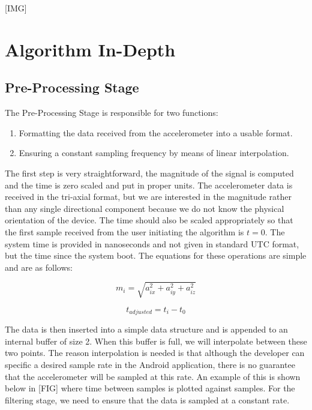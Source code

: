         [IMG]

    \chapter{Algorithm In-Depth}

        \section{Pre-Processing Stage}

            The Pre-Processing Stage is responsible for two functions:

            \begin{enumerate}
                \item Formatting the data received from the accelerometer into a usable format.
                \item Ensuring a constant sampling frequency by means of linear interpolation.
            \end{enumerate}

            The first step is very straightforward, the magnitude of the signal is computed and the time is zero scaled and put in proper units. The accelerometer data is received in the tri-axial format, but we are interested in the magnitude rather than any single directional component because we do not know the physical orientation of the device. The time should also be scaled appropriately so that the first sample received from the user initiating the algorithm is $t = 0$. The system time is provided in nanoseconds and not given in standard UTC format, but the time since the system boot. The equations for these operations are simple and are as follows:

            \begin{equation}
                m_i = \sqrt{a_{ix}^2 + a_{iy}^2 + a_{iz}^2}
            \end{equation}

            \begin{equation}
                t_{adjusted} = t_i - t_0
            \end{equation}

            The data is then inserted into a simple data structure and is appended to an internal buffer of size 2. When this buffer is full, we will interpolate between these two points. The reason interpolation is needed is that although the developer can specific a desired sample rate in the Android application, there is no guarantee that the accelerometer will be sampled at this rate. An example of this is shown below in [FIG] where time between samples is plotted against samples. For the filtering stage, we need to ensure that the data is sampled at a constant rate.

